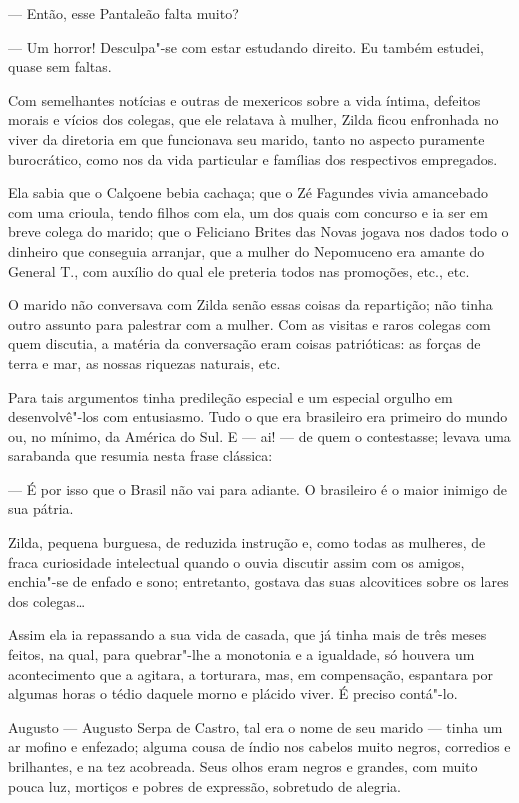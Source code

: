 --- Então, esse Pantaleão falta muito?

--- Um horror! Desculpa"-se com estar estudando direito. Eu também
estudei, quase sem faltas.

Com semelhantes notícias e outras de mexericos sobre a vida íntima,
defeitos morais e vícios dos colegas, que ele relatava à mulher, Zilda
ficou enfronhada no viver da diretoria em que funcionava seu marido,
tanto no aspecto puramente burocrático, como nos da vida particular e
famílias dos respectivos empregados.

Ela sabia que o Calçoene bebia cachaça; que o Zé Fagundes vivia
amancebado com uma crioula, tendo filhos com ela, um dos quais com
concurso e ia ser em breve colega do marido; que o Feliciano Brites das
Novas jogava nos dados todo o dinheiro que conseguia arranjar, que a
mulher do Nepomuceno era amante do General T., com auxílio do qual ele
preteria todos nas promoções, etc., etc.

O marido não conversava com Zilda senão essas coisas da repartição; não
tinha outro assunto para palestrar com a mulher. Com as visitas e raros
colegas com quem discutia, a matéria da conversação eram coisas
patrióticas: as forças de terra e mar, as nossas riquezas naturais, etc.

Para tais argumentos tinha predileção especial e um especial orgulho em
desenvolvê"-los com entusiasmo. Tudo o que era brasileiro era primeiro do
mundo ou, no mínimo, da América do Sul. E --- ai! --- de quem o
contestasse; levava uma sarabanda que resumia nesta frase clássica:

--- É por isso que o Brasil não vai para adiante. O brasileiro é o maior
inimigo de sua pátria.

Zilda, pequena burguesa, de reduzida instrução e, como todas as
mulheres, de fraca curiosidade intelectual quando o ouvia discutir assim
com os amigos, enchia"-se de enfado e sono; entretanto, gostava das suas
alcovitices sobre os lares dos colegas\ldots{}

Assim ela ia repassando a sua vida de casada, que já tinha mais de três
meses feitos, na qual, para quebrar"-lhe a monotonia e a igualdade, só
houvera um acontecimento que a agitara, a torturara, mas, em
compensação, espantara por algumas horas o tédio daquele morno e plácido
viver. É preciso contá"-lo.

Augusto --- Augusto Serpa de Castro, tal era o nome de seu marido ---
tinha um ar mofino e enfezado; alguma cousa de índio nos cabelos muito
negros, corredios e brilhantes, e na tez acobreada. Seus olhos eram
negros e grandes, com muito pouca luz, mortiços e pobres de expressão,
sobretudo de alegria.

